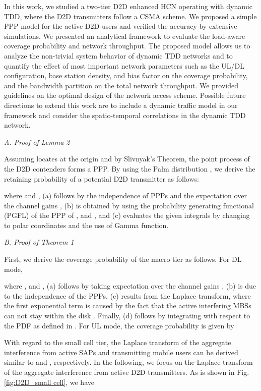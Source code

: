 \documentclass[twocolumn,english]{IEEEtran}
\theoremstyle{plain}
\theoremstyle{definition}
\begin{document}
In this work, we studied a two-tier D2D enhanced HCN operating with
dynamic TDD, where the D2D transmitters follow a CSMA scheme. We proposed
a simple PPP model for the active D2D users and verified the accuracy
by extensive simulations. We presented an analytical framework to
evaluate the load-aware coverage probability and network throughput.
The proposed model allows us to analyze the non-trivial system behavior
of dynamic TDD networks and to quantify the effect of most important
network parameters such as the UL/DL configuration, base station density,
and bias factor on the coverage probability, and the bandwidth partition
on the total network throughput. We provided guidelines on the optimal
design of the network access scheme. Possible future directions to
extend this work are to include a dynamic traffic model in our framework
and consider the spatio-temporal correlations in the dynamic TDD network.


\appendix{}

\emph{A. Proof of Lemma 2}

Assuming  locates at the origin and by Slivnyak's Theorem,
the point process of the D2D contenders forms a PPP. By using the
Palm distribution , we derive the retaining probability 
of a potential D2D transmitter as follows:

where 
and ,
(a) follows by the independence of PPPs and the expectation over the
channel gains , (b) is obtained by using the probability generating
functional (PGFL) of the PPP \cite{SGAI} of ,
 and , and
(c) evaluates the given integrals by changing to polar coordinates
and the use of Gamma function.

\emph{B. Proof of Theorem 1}

First, we derive the  coverage probability of the macro tier as follows.
For DL mode,

where ,
and ,
(a) follows by taking expectation over the channel gains , (b)
is due to the independence of the PPPs, (c) results from the Laplace
transform, where the first exponential term is caused by the fact
that the active interfering MBSs can not stay within the disk .
Finally, (d) follows by integrating with respect to the PDF 
as defined in . For UL mode, the  coverage
probability is given by



With regard to the small cell tier, the Laplace transform of the aggregate
interference from active SAPs and transmitting mobile users can be
derived similar to  and ,
respectively. In the following, we focus on the Laplace transform
of the aggregate interference from active D2D transmitters. As is
shown in Fig. \ref{fig:D2D_small cell}, we have
\end{document}
